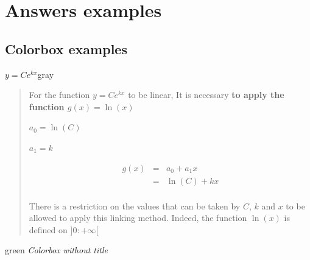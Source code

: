   
  \newpage

  \section{Answers examples}

    \subsection{Colorbox examples}

      \begin{colorbox}{{$y=Ce^{kx}$}}{gray}
            
        \begin{quote}
          For the function $y=Ce^{kx}$ to be linear, It is necessary \textbf{to apply the function \color{red}$g(x)=\ln(x)$}
          
          \vspace{0.5cm}

          $a_0=\ln(C)$

          $a_1=k$

          \begin{eqnarray*}
            g(x) &=& a_0 + a_1 x \\
                 &=& \ln(C) + kx \\
          \end{eqnarray*}

          \vspace{0.5cm}

          There is a restriction on the values that can be taken by $C$, $k$ and $x$ to be allowed to apply this linking method. Indeed, the function $\ln(x)$ is defined on $]0:+\infty[$

        \end{quote}
      \end{colorbox}

      \begin{colorbox}{}{green}
       \textit{Colorbox without title} 

       \vspace{0.5cm}

       \lipsum[10]
      \end{colorbox}

      \newpage

